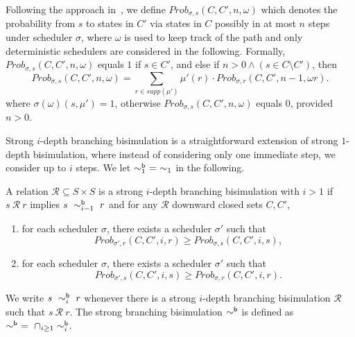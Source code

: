 \documentclass{LMCS}
\newcommand{\iBS}[1]{\sim_{#1}}
\newcommand{\iBSB}[1]{\sim_{#1}^{{\sf b}}}
\newcommand{\MC}[1]{\mathcal{#1}}
\newcommand{\MEASURE}{\mathit{Prob}}
\begin{document}
Following the approach in~\cite{van1996branching}, we define $\MEASURE_{\sigma,s}(C,C',n,\omega)$ which denotes the probability from $s$ to states in $C'$ via states in $C$ possibly in at most $n$ steps under scheduler $\sigma$, where $\omega$ is used to keep track of the path and only deterministic schedulers are considered in the following. Formally, $\MEASURE_{\sigma,s}(C,C',n,\omega)$ equals $1$ if $s\in C'$, and else if $n>0\land(s\in C\setminus C')$, then
\begin{equation}\label{eq:definition of transition branching}
\MEASURE_{\sigma,s}(C,C',n,\omega)=
\sum\limits_{r\in\mathit{supp}(\mu')}\mu'(r)\cdot\MEASURE_{\sigma,r}(C,C',n-1,\omega r).
\end{equation}
where $\sigma(\omega)(s,\mu')=1$, otherwise $\MEASURE_{\sigma,s}(C,C',n,\omega)$ equals 0, provided $n>0$.

Strong $i$-depth branching bisimulation is a straightforward extension of strong $1$-depth bisimulation, where instead of considering only one immediate step, we consider up to $i$ steps. We let $\iBSB{1} ~=~\iBS{1}$ in the following.
\begin{defi}\label{def:index strong bisimulation branching}
A relation $\MC{R}\subseteq S\times S$ is a
strong $i$-depth branching bisimulation with $i>1$ if $s~\MC{R}~r$ implies $s~\iBSB{i-1}~r$ and for any $\MC{R}$ downward closed sets $C,C'$,
\begin{enumerate}[(1)]
\item for each scheduler $\sigma$, there exists a scheduler $\sigma'$ such that $$\MEASURE_{\sigma',r}(C,C',i,r)\geq\MEASURE_{\sigma,s}(C,C',i,s),$$
\item for each scheduler $\sigma$, there exists a scheduler $\sigma'$ such that $$\MEASURE_{\sigma',s}(C,C',i,s)\geq\MEASURE_{\sigma,r}(C,C',i,r).$$
\end{enumerate}
We write $s~\iBSB{i}~r$ whenever there is a strong $i$-depth branching bisimulation $\MC{R}$ such that $s~\MC{R}~r$. The strong branching bisimulation $\iBSB{}$ is defined as $\iBSB{}~=~\cap_{i\ge 1}\iBSB{i}$.
\end{defi}
\end{document}
